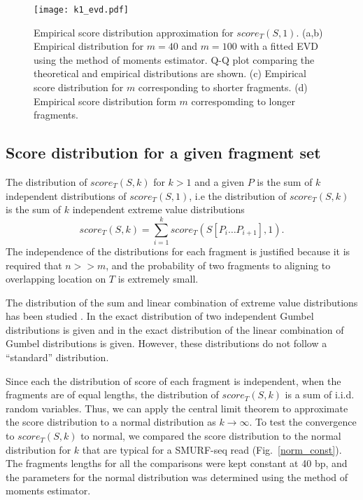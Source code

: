 \begin{figure}[H]
\centering
\texttt{[image: k1\_evd.pdf]}
\caption[Extreme value distribution approximation for $score_T(S,1)$]{
  Empirical score distribution approximation for $score_T(S,1)$. 
  (a,b) Empirical distribution for $m=40$ and $m=100$ with a fitted EVD 
  using the method of moments estimator. Q-Q plot comparing the 
  theoretical and empirical distributions are shown.
  (c) Empirical score distribution for $m$ corresponding to shorter
  fragments.
  (d) Empirical score distribution form $m$ correspomding to longer
  fragments.}
\label{evd_approx}
\end{figure}



\subsection{Score distribution for a given fragment set}
The distribution of $score_T(S,k)$ for $k > 1$ and a given $P$ is the
sum of $k$ independent distributions of $score_T(S,1)$, i.e the
distribution of $score_T(S,k)$ is the sum of $k$ independent extreme
value distributions \[score_T(S,k) = \sum_{i=1}^{k} score_T(S[P_i \dots
P_{i+1}], 1).\]
The independence of the distributions for each fragment is justified
because it is required that $n >> m$, and the probability of two
fragments to aligning to overlapping location on $T$ is extremely small.

The distribution of the sum and linear combination of extreme value
distributions has been studied \citep{cetinkaya2001scalable,
marques2015distribution,loaiciga1999analysis,nadarajah2008exact}.  In
\citep{loaiciga1999analysis} the exact distribution of two independent
Gumbel distributions is given and in \citep{nadarajah2008exact} the exact
distribution of the linear combination of Gumbel distributions is given.
%
However, these distributions do not follow a ``standard'' distribution.

Since each the distribution of score of each fragment is independent,
when the fragments are of equal lengths, the distribution of
$score_T(S,k)$ is a sum of i.i.d. random variables. Thus, we can apply
the central limit theorem to approximate the score distribution to a
normal distribution as $k \to \infty$. To test the convergence to
$score_T(S,k)$ to normal, we compared the score distribution to the
normal distribution for $k$ that are typical for a SMURF-seq read
(Fig.~\ref{norm_const}). The fragments lengths for all the comparisons
were kept constant at 40 bp, and the parameters for the normal
distribution was determined using the method of moments estimator.

